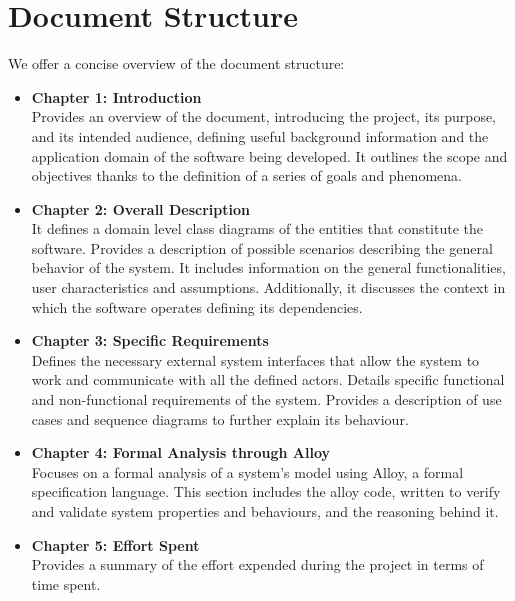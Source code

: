 \documentclass[11pt]{report}
\begin{document}
    \section{Document Structure}
    We offer a concise overview of the document structure: 
    \begin{itemize}
        \item \textbf{Chapter 1: Introduction}\\
        Provides an overview of the document, introducing the project, its purpose, and its intended audience, defining useful 
        background information and the application domain of the software being developed. 
        It outlines the scope and objectives thanks to the definition of a series of goals and phenomena.
        
        \item \textbf{Chapter 2: Overall Description}\\
        It defines a domain level class diagrams of the entities that constitute the software.
        Provides a description of possible scenarios describing the general behavior of the system.
        It includes information on the general functionalities, user characteristics and assumptions.
        Additionally, it discusses the context in which the software operates defining its dependencies.
        
        \item \textbf{Chapter 3: Specific Requirements}\\
        Defines the necessary external system interfaces that allow the system to work and communicate with all the defined actors.
        Details specific functional and non-functional requirements of the system. 
        Provides a description of use cases and sequence diagrams to further explain its behaviour.
        
        \item \textbf{Chapter 4: Formal Analysis through Alloy}\\
        Focuses on a formal analysis of a system's model using Alloy, a formal specification language.
        This section includes the alloy code, written to verify and validate system properties and behaviours, and the reasoning behind it.
        
        \item \textbf{Chapter 5: Effort Spent}\\
        Provides a summary of the effort expended during the project in terms of time spent.
    \end{itemize}
\end{document}
